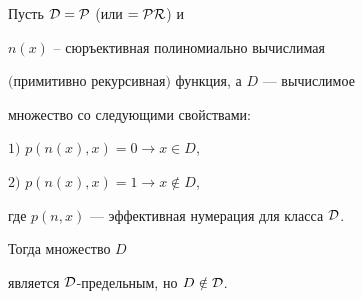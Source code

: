 \begin{prop}\label{pro1-1}


Пусть $\cal{D}=\cal{P}$ (или $=\cal{PR}$) и


$n(x)$ -- сюръективная полиномиально вычислимая


$($примитивно рекурсивная$)$ функция, а $D$ --- вычислимое


множество со следующими свойствами\/${:}$





$1)$ $p(n(x),x)=0\rightarrow x\in D$,





$2)$ $p(n(x),x)=1\rightarrow x\notin D$,





\noindent{}где $p(n,x)$ --- эффективная нумерация для класса $\cal{D}$.





Тогда множество $D$ 


является $\cal{D}$-предельным, но $D\notin\cal{D}$.


\end{prop}





